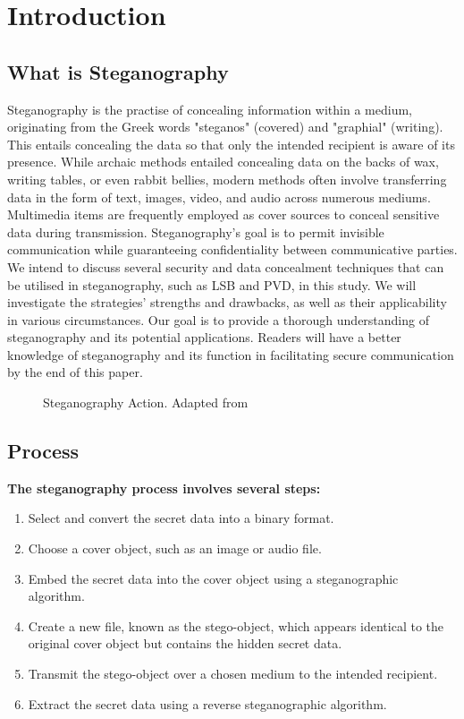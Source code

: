\chapter{Introduction}
\section{What is Steganography}
Steganography is the practise of concealing information within a medium, originating from the Greek words "steganos" (covered) and "graphial" (writing). This entails concealing the data so that only the intended recipient is aware of its presence. While archaic methods entailed concealing data on the backs of wax, writing tables, or even rabbit bellies, modern methods often involve transferring data in the form of text, images, video, and audio across numerous mediums. Multimedia items are frequently employed as cover sources to conceal sensitive data during transmission. Steganography's goal is to permit invisible communication while guaranteeing confidentiality between communicative parties.
We intend to discuss several security and data concealment techniques that can be utilised in steganography, such as LSB and PVD, in this study. We will investigate the strategies' strengths and drawbacks, as well as their applicability in various circumstances. Our goal is to provide a thorough understanding of steganography and its potential applications. Readers will have a better knowledge of steganography and its function in facilitating secure communication by the end of this paper.
\begin{figure}[ht!]
\centering
{}
\caption{Steganography Action. Adapted from \cite{article2}}
\end{figure}
\section{Process}
\textbf{The steganography process involves several steps:}
\begin{enumerate}
\item Select and convert the secret data into a binary format.
\item Choose a cover object, such as an image or audio file.
\item Embed the secret data into the cover object using a steganographic algorithm.
\item Create a new file, known as the stego-object, which appears identical to the original cover object but contains the hidden secret data.
\item Transmit the stego-object over a chosen medium to the intended recipient.
\item Extract the secret data using a reverse steganographic algorithm.
\end{enumerate}

